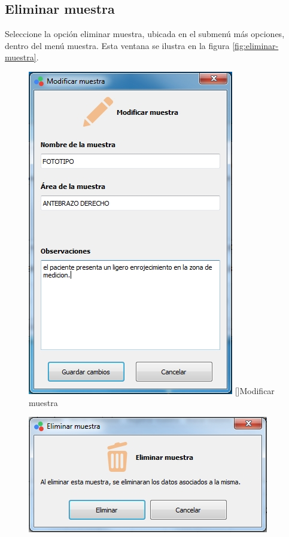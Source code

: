 	\subsection*{Eliminar muestra}
	
	Seleccione la opci\'{o}n eliminar muestra, ubicada en el submen\'{u} m\'{a}s opciones, dentro del men\'{u} muestra. Esta ventana se ilustra en la figura \ref{fig:eliminar-muestra}.
	
\begin{figure}[H]
\centering
\begin{minipage}{.5\textwidth}
  \centering
  \includegraphics[width=.9\linewidth]{./img/modificar-muestra.jpg}
  []{Modificar muestra}
  \label{fig:modificar-muestra}
\end{minipage}%
\begin{minipage}{.5\textwidth}
  \centering
  \includegraphics[width=1\linewidth]{./img/eliminar-muestra.jpg}

\end{minipage}
\end{figure}
